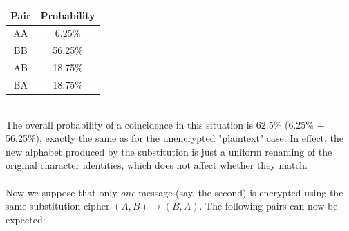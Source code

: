 \documentclass[Lau,binding=0.6cm,oneside]{sapthesis}
\begin{document}
\begin{center}
 \begin{tabular}{||c c||} 
 \hline
 Pair & Probability\\ [0.5ex] 
 \hline\hline
 \textsf{AA} & 6.25\% \\ 
 \hline
 \textsf{BB} & 56.25\% \\
 \hline
 \textsf{AB} & 18.75\% \\
 \hline
 \textsf{BA} & 18.75\% \\
 \hline
\end{tabular}
\end{center}
\ \\
The overall probability of a coincidence in this situation is 62.5\% (6.25\% + 56.25\%), exactly the same as for the unencrypted "plaintext" case. In effect, the new alphabet produced by the substitution is just a uniform renaming of the original character identities, which does not affect whether they match.\\\\
Now we suppose that only \textit{one} message (say, the second) is encrypted using the same substitution cipher $(A, B) \rightarrow (B,A)$. The following pairs can now be expected:\\
\end{document}

